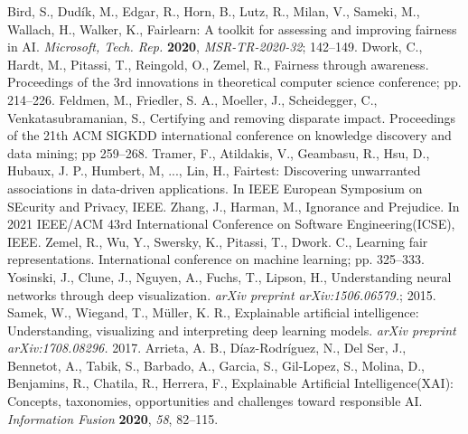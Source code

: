 \documentclass[journal,article,submit,moreauthors,pdftex]{Definitions/mdpi}
\begin{document}
%

\begin{thebibliography}{999}
Bird, S., Dudík, M., Edgar, R., Horn, B., Lutz, R., Milan, V., Sameki, M., Wallach, H., Walker, K., Fairlearn: A toolkit for assessing and improving fairness in AI. {\em Microsoft, Tech. Rep.} {\bf 2020}, {\em MSR-TR-2020-32}; 142--149.
Dwork, C., Hardt, M., Pitassi, T., Reingold, O., Zemel, R., Fairness through awareness. Proceedings of the 3rd innovations in theoretical computer science conference; pp. 214--226.
Feldmen, M., Friedler, S. A., Moeller, J., Scheidegger, C., Venkatasubramanian, S., Certifying and removing disparate impact. Proceedings of the 21th ACM SIGKDD international conference on knowledge discovery and data mining; pp 259--268.
Tramer, F., Atildakis, V., Geambasu, R., Hsu, D., Hubaux, J. P., Humbert, M, ..., Lin, H., Fairtest: Discovering unwarranted associations in data-driven applications. In IEEE European Symposium on SEcurity and Privacy, IEEE.
Zhang, J., Harman, M., Ignorance and Prejudice. In 2021 IEEE/ACM 43rd International Conference on Software Engineering(ICSE), IEEE.
Zemel, R., Wu, Y., Swersky, K., Pitassi, T., Dwork. C., Learning fair representations. International conference on machine learning; pp. 325--333.
Yosinski, J., Clune, J., Nguyen, A., Fuchs, T., Lipson, H., Understanding neural networks through deep visualization. \textit{arXiv preprint arXiv:1506.06579.}; 2015.
Samek, W., Wiegand, T., Müller, K. R., Explainable artificial intelligence: Understanding, visualizing and interpreting deep learning models. \textit{arXiv preprint arXiv:1708.08296.} 2017.
Arrieta, A. B., Díaz-Rodríguez, N., Del Ser, J., Bennetot, A., Tabik, S., Barbado, A., Garcia, S., Gil-Lopez, S., Molina, D., Benjamins, R., Chatila, R., Herrera, F., Explainable Artificial Intelligence(XAI): Concepts, taxonomies, opportunities and challenges toward responsible AI. {\em Information Fusion} {\bf 2020}, {\em 58}, 82--115.

\end{thebibliography}
\end{document}
